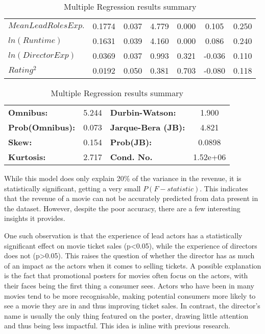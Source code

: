 \begin{table}[H]
\begin{center}
\begin{tabular}{lcccccc}
            \textbf{$Mean Lead Roles Exp.$} &       0.1774  &        0.037     &     4.779  &         0.000        &        0.105    &        0.250     \\
            \textbf{$ln(Runtime)$}          &       0.1631  &        0.039     &     4.160  &         0.000        &        0.086    &        0.240     \\
            \textbf{$ln(Director Exp)$}     &       0.0369  &        0.037     &     0.993  &         0.321        &       -0.036    &        0.110     \\
            \textbf{$Rating^2$}             &       0.0192  &        0.050     &     0.381  &         0.703        &       -0.080    &        0.118     \\
            \bottomrule
            \end{tabular}
            \begin{tabular}{lclc}
            \textbf{Omnibus:}       &  5.244 & \textbf{  Durbin-Watson:     } &    1.900  \\
            \textbf{Prob(Omnibus):} &  0.073 & \textbf{  Jarque-Bera (JB):  } &    4.821  \\
            \textbf{Skew:}          &  0.154 & \textbf{  Prob(JB):          } &   0.0898  \\
            \textbf{Kurtosis:}      &  2.717 & \textbf{  Cond. No.          } & 1.52e+06  \\
            \bottomrule
            \end{tabular}
        \end{center}
        
        \caption[short]{Multiple Regression results summary}\label{tab:revenue-ols-summary}
    \end{table}
    While this model does only explain 20\% of the variance in the revenue, it is statistically significant,
        getting a very small  $P(F-statistic)$.
    This indicates that the revenue of a movie can not be accurately predicted from data
        present in the dataset.
    However, despite the poor accuracy, there are a few interesting insights it provides.
    
    One such observation is that the experience of lead actors has a statistically significant effect
        on movie ticket sales (p<0.05), while the experience of directors does not (p>0.05). 
    This raises the question of whether the director has as much of an impact as the actors when it
        comes to selling tickets.
    A possible explanation is the fact that promotional posters for movies often focus on the
        actors\cite*{label}, with their faces being the first thing a consumer sees.
    Actors who have been in many movies tend to be more recognisable, making potential consumers more
        likely to see a movie they are in and thus improving ticket sales.
    In contrast, the director's name is usually the only thing featured on the poster, drawing little
        attention and thus being less impactful.
    This idea is inline with previous research\cite*{label}.

